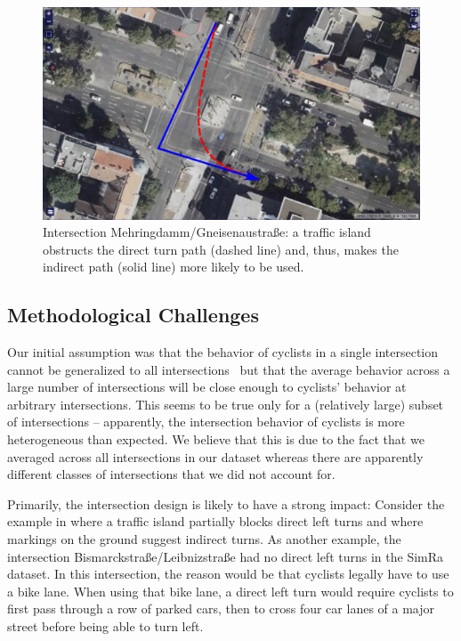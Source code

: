 \begin{figure}
    \centering
    \includegraphics[width=0.7\columnwidth]{fig/mehringdamm_island_arrows.png}
    \caption{Intersection Mehringdamm/Gneisenaustraße: a traffic island obstructs the direct turn path (dashed line) and, thus, makes the indirect path (solid line) more likely to be used.}
    \label{fig:mehringdamm_traffic_island}
\end{figure}

\subsection{Methodological Challenges}
\label{subsec:methodological_challenges_sumo}
Our initial assumption was that the behavior of cyclists in a single intersection cannot be generalized to all intersections~\cite{kaths2016integration} but that the average behavior across a large number of intersections will be close enough to cyclists' behavior at arbitrary intersections.
This seems to be true only for a (relatively large) subset of intersections -- apparently, the intersection behavior of cyclists is more heterogeneous than expected.
We believe that this is due to the fact that we averaged across all intersections in our dataset whereas there are apparently different classes of intersections that we did not account for.

Primarily, the intersection design is likely to have a strong impact:
Consider the example in  where a traffic island partially blocks direct left turns and where markings on the ground suggest indirect turns.
As another example, the intersection Bismarckstraße/Leibnizstraße had no direct left turns in the SimRa dataset.
In this intersection, the reason would be that cyclists legally have to use a bike lane.
When using that bike lane, a direct left turn would require cyclists to first pass through a row of parked cars, then to cross four car lanes of a major street before being able to turn left.

